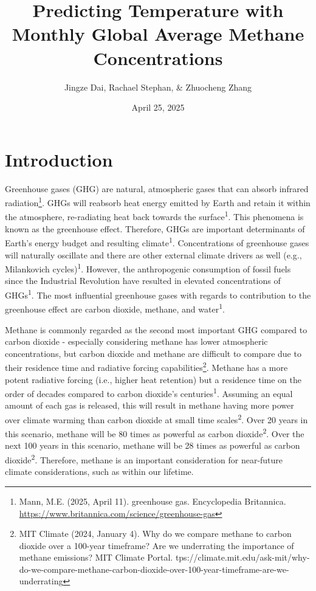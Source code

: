 \documentclass[
]{article}
\title{Predicting Temperature with Monthly Global Average Methane
Concentrations}
\author{Jingze Dai, Rachael Stephan, \& Zhuocheng Zhang}
\date{April 25, 2025}
\begin{document}
\maketitle

\section{Introduction}\label{introduction}

Greenhouse gases (GHG) are natural, atmospheric gases that can absorb
infrared radiation\footnote{Mann, M.E. (2025, April 11). greenhouse gas.
  Encyclopedia Britannica.
  \url{https://www.britannica.com/science/greenhouse-gas}}. GHGs will
reabsorb heat energy emitted by Earth and retain it within the
atmosphere, re-radiating heat back towards the
surface\textsuperscript{1}. This phenomena is known as the greenhouse
effect. Therefore, GHGs are important determinants of Earth's energy
budget and resulting climate\textsuperscript{1}. Concentrations of
greenhouse gases will naturally oscillate and there are other external
climate drivers as well (e.g., Milankovich cycles)\textsuperscript{1}.
However, the anthropogenic consumption of fossil fuels since the
Industrial Revolution have resulted in elevated concentrations of
GHGs\textsuperscript{1}. The most influential greenhouse gases with
regards to contribution to the greenhouse effect are carbon dioxide,
methane, and water\textsuperscript{1}.

Methane is commonly regarded as the second most important GHG compared
to carbon dioxide - especially considering methane has lower atmospheric
concentrations, but carbon dioxide and methane are difficult to compare
due to their residence time and radiative forcing
capabilities\footnote{MIT Climate (2024, January 4). Why do we compare
  methane to carbon dioxide over a 100-year timeframe? Are we
  underrating the importance of methane emissions? MIT Climate Portal.
  tps://climate.mit.edu/ask-mit/why-do-we-compare-methane-carbon-dioxide-over-100-year-timeframe-are-we-underrating}.
Methane has a more potent radiative forcing (i.e., higher heat
retention) but a residence time on the order of decades compared to
carbon dioxide's centuries\textsuperscript{1}. Assuming an equal amount
of each gas is released, this will result in methane having more power
over climate warming than carbon dioxide at small time
scales\textsuperscript{2}. Over 20 years in this scenario, methane will
be 80 times as powerful as carbon dioxide\textsuperscript{2}. Over the
next 100 years in this scenario, methane will be 28 times as powerful as
carbon dioxide\textsuperscript{2}. Therefore, methane is an important
consideration for near-future climate considerations, such as within our
lifetime.
\end{document}
